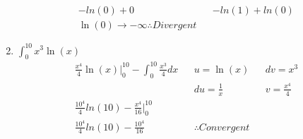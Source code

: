 \documentclass[11pt]{article}
\newcommand{\bv}[2]{\big\vert_{#1}^{#2}}
\begin{document}
\begin{enumerate}
\begin{align*}
            -ln(0) + 0 && -ln(1) + ln(0)\\
            \ln(0) \to -\infty \therefore Divergent
        \end{align*}
        \item $ \int_{0}^{10}x^3\ln(x)$
        \begin{align*}
            \label{q2:5}
            \frac{x^4}{4}\ln(x)\bv{0}{10} - \int_{0}^{10}\frac{x^3}{4}dx && u = \ln(x) && dv = x^3 \\
            && du = \frac{1}{x} && v = \frac{x^4}{4} \\
            \frac{10^4}{4}ln(10) - \frac{x^4}{16}\bv{0}{10} \\
            \frac{10^4}{4}ln(10) - \frac{10^4}{16} &&  \therefore Convergent
        \end{align*}
    \end{enumerate}
\end{document}
